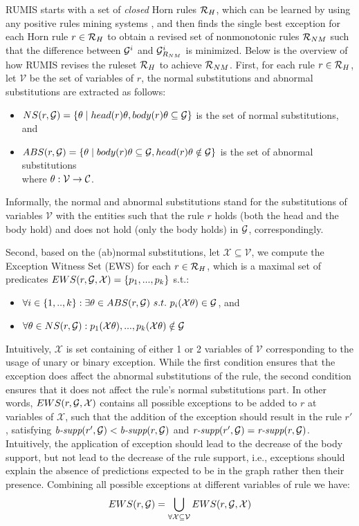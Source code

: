  RUMIS starts with a set of \textit{closed} Horn rules $\mathcal{R}_H$, which can be learned by using any positive rules mining systems \cite{amie,op,rdf2rules}, and then finds the single best exception for each Horn rule $r \in \mathcal{R}_H$ to obtain a revised set of nonmonotonic rules $\mathcal{R}_{NM}$ such that the difference between $\mathcal{G}^i$ and $\mathcal{G}^i_{R_{NM}}$ is minimized. Below is the overview of how RUMIS revises the ruleset $\mathcal{R}_H$ to achieve $\mathcal{R}_{NM}$.
 First, for each rule $r \in \mathcal{R}_H$, let $\mathcal{V}$ be the set of variables of $r$, the normal substitutions and abnormal substitutions are extracted as follows:
\begin{itemize}
\item $NS(r, \mathcal{G}) = \{\theta \mid head(r)\theta, body(r)\theta \subseteq \mathcal{G}\}$ is the set of normal substitutions, and
\item $ABS(r, \mathcal{G}) = \{\theta \mid body(r)\theta \subseteq \mathcal{G} , head(r)\theta \notin \mathcal{G}\}$ is the set of abnormal substitutions\\
where $\theta: \mathcal{V} \rightarrow \mathcal{C}$.
\end{itemize}
Informally, the normal and abnormal substitutions stand for the substitutions of variables $\mathcal{V}$ with the entities such that the rule $r$ holds (both the head and the body hold) and does not hold (only the body holds) in $\mathcal{G}$, correspondingly.

Second, based on the (ab)normal substitutions, let $\mathcal{X} \subseteq \mathcal{V}$, we compute the Exception Witness Set (EWS) for each $r \in \mathcal{R}_H$, which is a maximal set of predicates $EWS(r,\mathcal{G},\mathcal{X}) = \{p_1,...,p_k\}$ s.t.:
\begin{itemize}
\item $\forall i \in \{1,..,k\} : \exists \theta \in ABS(r, \mathcal{G})\ s.t.\ p_i(\mathcal{X}\theta) \in \mathcal{G}$, and 
\item $\forall \theta \in NS(r,\mathcal{G}) :  p_1(\mathcal{X}\theta), ...,p_k(\mathcal{X}\theta) \notin \mathcal{G}$
\end{itemize}
Intuitively, $\mathcal{X}$ is set containing of either 1 or 2 variables of $\mathcal{V}$ corresponding to the usage of unary or binary exception. While the first condition ensures that the exception does affect the abnormal substitutions of the rule, the second condition ensures that it does not affect the rule's normal substitutions part. In other words, $EWS(r,\mathcal{G},\mathcal{X})$ contains all possible exceptions to be added to $r$ at variables of $\mathcal{X}$, such that the addition of the exception should result in the rule $r'$, satisfying $\textit{b-supp}(r', \mathcal{G}) < \textit{b-supp}(r, \mathcal{G})$ and $\textit{r-supp}(r', \mathcal{G}) = \textit{r-supp}(r, \mathcal{G})$. Intuitively, the application of exception should lead to the decrease of the body support, but not lead to the decrease of
the rule support, i.e., exceptions should explain the absence of predictions expected to be in the graph rather then their presence.
Combining all possible exceptions at different variables of rule we have:
\[EWS(r,\mathcal{G}) = \bigcup_{\forall\mathcal{X}\subseteq \mathcal{V}}EWS(r,\mathcal{G},\mathcal{X})\]

